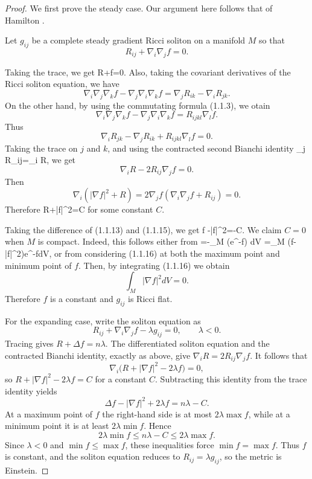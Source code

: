 \begin{proof}
We first prove the steady case. Our argument here follows that of Hamilton
\cite{Ha95F}.

Let $g_{ij}$ be a complete steady gradient Ricci soliton on a
manifold $M$ so that
$$
R_{ij}+\nabla_i\nabla_jf=0.
$$

Taking the trace, we get \be
R+\Delta f=0. %
\ee Also, taking the covariant derivatives of the Ricci soliton
equation, we have
$$
\nabla_i\nabla_j\nabla_kf-\nabla_j\nabla_i\nabla_kf
=\nabla_jR_{ik}-\nabla_iR_{jk}.
$$
On the other hand, by using the commutating formula (1.1.3), we
otain
$$
\nabla_i\nabla_j\nabla_kf-\nabla_j\nabla_i\nabla_kf
=R_{ijkl}\nabla_lf.
$$
Thus
$$
\nabla_iR_{jk}-\nabla_jR_{ik}+R_{ijkl}\nabla_lf=0.
$$
Taking the trace on $j$ and $k$, and using the contracted second
Bianchi identity \be
\nabla_j R_{ij}=\nabla_i R, %
\ee we get
$$
\nabla_iR-2R_{ij}\nabla_jf=0.
$$
Then
$$
\nabla_i(|\nabla f|^2+R)=2\nabla_jf(\nabla_i\nabla_jf+R_{ij})=0.
$$
Therefore \be
R+|\nabla f|^2=C %
\ee for some constant $C$.

Taking the difference of (1.1.13) and (1.1.15), we get \be
\Delta f -|\nabla f|^2=-C. %
\ee We claim $C=0$ when $M$ is compact. Indeed, this follows
either from =-\int_M \Delta(e^{-f}) dV
=\int_M (\Delta f-|\nabla f|^2)e^{-f}dV, %
\ee or from considering (1.1.16) at both the maximum point and
minimum point of $f$. Then, by integrating (1.1.16) we obtain
$$
\int_M |\nabla f|^2 dV=0.
$$
Therefore $f$ is a constant and $g_{ij}$ is Ricci flat.

For the expanding case, write the soliton equation as
\[
R_{ij}+\nabla_i\nabla_jf-\lambda g_{ij}=0,
\qquad \lambda<0.
\]
Tracing gives $R+\Delta f=n\lambda$.  The differentiated soliton
equation and the contracted Bianchi identity, exactly as above, give
$\nabla_iR=2R_{ij}\nabla_jf$.  It follows that
\[
\nabla_i\bigl(R+|\nabla f|^2-2\lambda f\bigr)=0,
\]
so $R+|\nabla f|^2-2\lambda f=C$ for a constant $C$.  Subtracting
this identity from the trace identity yields
\[
\Delta f-|\nabla f|^2+2\lambda f=n\lambda-C.
\]
At a maximum point of $f$ the right-hand side is at most
$2\lambda\max f$, while at a minimum point it is at least
$2\lambda\min f$.  Hence
\[
2\lambda\min f\le n\lambda-C\le2\lambda\max f.
\]
Since $\lambda<0$ and $\min f\le\max f$, these inequalities force
$\min f=\max f$.  Thus $f$ is constant, and the soliton equation
reduces to $R_{ij}=\lambda g_{ij}$, so the metric is Einstein.
\end{proof}


